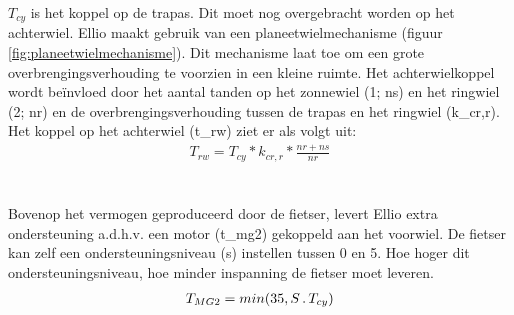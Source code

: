 \noindent $T_{cy}$ is het koppel op de trapas. Dit moet nog overgebracht worden op het achterwiel. Ellio maakt gebruik van een planeetwielmechanisme (figuur \ref{fig:planeetwielmechanisme}). Dit mechanisme laat toe om een grote overbrengingsverhouding te voorzien in een kleine ruimte. Het achterwielkoppel wordt beïnvloed door het aantal tanden op het zonnewiel (1; \gls{ns}) en het ringwiel (2; \gls{nr}) en de overbrengingsverhouding tussen de trapas en het ringwiel (\gls{k_cr,r}). Het koppel op het achterwiel (\gls{t_rw}) ziet er als volgt uit:
\begin{gather*}
T_{rw}=T_{cy}*k_{cr,r}*\frac{nr+ns}{nr}
\end{gather*}
\\\\
Bovenop het vermogen geproduceerd door de fietser, levert Ellio extra ondersteuning a.d.h.v. een motor (\gls{t_mg2}) gekoppeld aan het voorwiel. De fietser kan zelf een ondersteuningsniveau (\gls{s}) instellen tussen 0 en 5. Hoe hoger dit ondersteuningsniveau, hoe minder inspanning de fietser moet leveren. 
\begin{gather*}
T_{MG2}=min(35,S\thinspace .\thinspace T_{cy})
\end{gather*}


